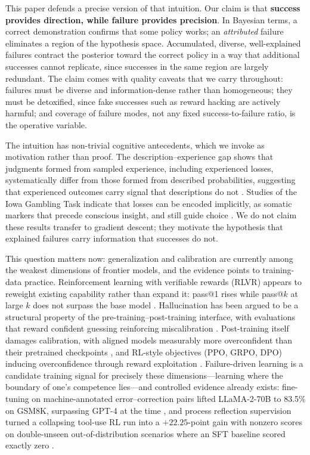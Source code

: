 \documentclass[10pt]{article}
\begin{document}
This paper defends a precise version of that intuition.\label{sec:intro-arg} Our claim is that \textbf{success provides direction, while failure provides precision}. In Bayesian terms, a correct demonstration confirms that some policy works; an \emph{attributed} failure eliminates a region of the hypothesis space. Accumulated, diverse, well-explained failures contract the posterior toward the correct policy in a way that additional successes cannot replicate, since successes in the same region are largely redundant. The claim comes with quality caveats that we carry throughout: failures must be diverse and information-dense rather than homogeneous; they must be detoxified, since fake successes such as reward hacking are actively harmful; and coverage of failure modes, not any fixed success-to-failure ratio, is the operative variable.

The intuition has non-trivial cognitive antecedents, which we invoke as motivation rather than proof. The description--experience gap shows that judgments formed from sampled experience, including experienced losses, systematically differ from those formed from described probabilities, suggesting that experienced outcomes carry signal that descriptions do not \cite{hertwig2009}. Studies of the Iowa Gambling Task indicate that losses can be encoded implicitly, as somatic markers that precede conscious insight, and still guide choice \cite{bechara2005}. We do not claim these results transfer to gradient descent; they motivate the hypothesis that explained failures carry information that successes do not.

This question matters now: generalization and calibration are currently among the weakest dimensions of frontier models, and the evidence points to training-data practice. Reinforcement learning with verifiable rewards (RLVR) appears to reweight existing capability rather than expand it: pass@1 rises while pass@$k$ at large $k$ does not surpass the base model \cite{yue2025rlvr}. Hallucination has been argued to be a structural property of the pre-training--post-training interface, with evaluations that reward confident guessing reinforcing miscalibration \cite{kalai2025halluc}. Post-training itself damages calibration, with aligned models measurably more overconfident than their pretrained checkpoints \cite{he2023calibration}, and RL-style objectives (PPO, GRPO, DPO) inducing overconfidence through reward exploitation \cite{xie2026know}. Failure-driven learning is a candidate training signal for precisely these dimensions---learning where the boundary of one's competence lies---and controlled evidence already exists: fine-tuning on machine-annotated error--correction pairs lifted LLaMA-2-70B to 83.5\% on GSM8K, surpassing GPT-4 at the time \cite{an2023lema}, and process reflection supervision turned a collapsing tool-use RL run into a $+22.25$-point gain with nonzero scores on double-unseen out-of-distribution scenarios where an SFT baseline scored exactly zero \cite{hao2026prs}.
\end{document}

